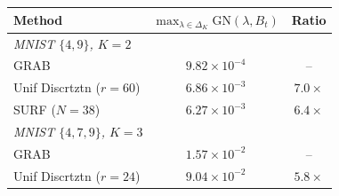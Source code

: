 \begin{tabular}{lcc}
\toprule
Method & $\max_{\lambda\in\Delta_K}\mathrm{GN}(\lambda,B_t)$ & Ratio \\
\midrule
\multicolumn{3}{l}{\emph{MNIST $\{4,9\}$, $K=2$}} \\
GRAB & $9.82\times10^{-4}$ & -- \\
Unif Discrtztn ($r=60$) & $6.86\times10^{-3}$ & $7.0\times$ \\
SURF ($N=38$) & $6.27\times10^{-3}$ & $6.4\times$ \\
\midrule
\multicolumn{3}{l}{\emph{MNIST $\{4,7,9\}$, $K=3$}} \\
GRAB & $1.57\times10^{-2}$ & -- \\
Unif Discrtztn ($r=24$) & $9.04\times10^{-2}$ & $5.8\times$ \\
\bottomrule
\end{tabular}

